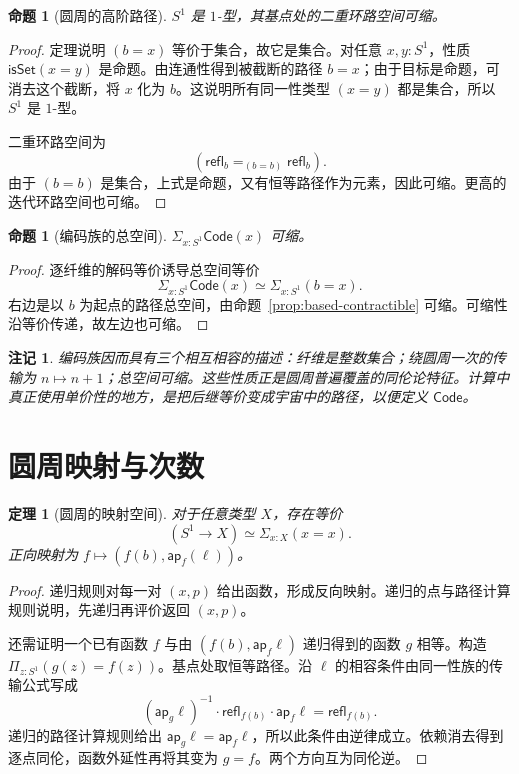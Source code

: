 \documentclass[12pt,oneside,openany,fontset=none]{ctexbook}
\theoremstyle{cn}
\newtheorem{proposition}[definition]{命题}
\newtheorem{theorem}[definition]{定理}
\newtheorem{remark}[definition]{注记}
\numberwithin{equation}{chapter}
\newcommand{\refl}{\mathsf{refl}}
\newcommand{\ap}{\mathsf{ap}}
\newcommand{\isSet}{\mathsf{isSet}}
\begin{document}
\begin{proposition}[圆周的高阶路径]
$S^1$ 是 $1$-型，其基点处的二重环路空间可缩。
\end{proposition}
\begin{proof}
定理说明 $(b=x)$ 等价于集合，故它是集合。对任意 $x,y:S^1$，性质 $\isSet(x=y)$ 是命题。由连通性得到被截断的路径 $b=x$；由于目标是命题，可消去这个截断，将 $x$ 化为 $b$。这说明所有同一性类型 $(x=y)$ 都是集合，所以 $S^1$ 是 $1$-型。

二重环路空间为
\[
 (\refl_b=_{(b=b)}\refl_b).
\]
由于 $(b=b)$ 是集合，上式是命题，又有恒等路径作为元素，因此可缩。更高的迭代环路空间也可缩。
\end{proof}

\begin{proposition}[编码族的总空间]
$\Sigma_{x:S^1}\mathsf{Code}(x)$ 可缩。
\end{proposition}
\begin{proof}
逐纤维的解码等价诱导总空间等价
\[
 \Sigma_{x:S^1}\mathsf{Code}(x)
 \simeq
 \Sigma_{x:S^1}(b=x).
\]
右边是以 $b$ 为起点的路径总空间，由命题~\ref{prop:based-contractible} 可缩。可缩性沿等价传递，故左边也可缩。
\end{proof}

\begin{remark}
编码族因而具有三个相互相容的描述：纤维是整数集合；绕圆周一次的传输为 $n\mapsto n+1$；总空间可缩。这些性质正是圆周普遍覆盖的同伦论特征。计算中真正使用单价性的地方，是把后继等价变成宇宙中的路径，以便定义 $\mathsf{Code}$。
\end{remark}

\section{圆周映射与次数}

\begin{theorem}[圆周的映射空间]
对于任意类型 $X$，存在等价
\[
 (S^1\to X)\simeq\Sigma_{x:X}(x=x).
\]
正向映射为 $f\mapsto(f(b),\ap_f(\ell))$。
\end{theorem}
\begin{proof}
递归规则对每一对 $(x,p)$ 给出函数，形成反向映射。递归的点与路径计算规则说明，先递归再评价返回 $(x,p)$。

还需证明一个已有函数 $f$ 与由 $(f(b),\ap_f\ell)$ 递归得到的函数 $g$ 相等。构造 $\Pi_{z:S^1}(g(z)=f(z))$。基点处取恒等路径。沿 $\ell$ 的相容条件由同一性族的传输公式写成
\[
 (\ap_g\ell)^{-1}\cdot\refl_{f(b)}\cdot\ap_f\ell
 =\refl_{f(b)}.
\]
递归的路径计算规则给出 $\ap_g\ell=\ap_f\ell$，所以此条件由逆律成立。依赖消去得到逐点同伦，函数外延性再将其变为 $g=f$。两个方向互为同伦逆。
\end{proof}
\end{document}
